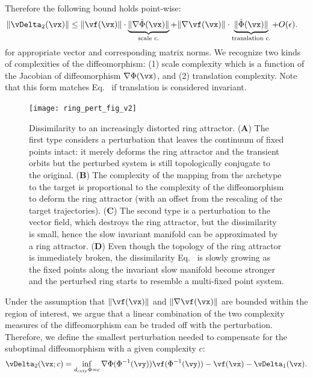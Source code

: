 \documentclass{article}
\theoremstyle{definition} \newtheorem{definition}{Definition}  \newtheorem{example}{Example}
\theoremstyle{remark} \newtheorem{remark}{Remark}
\renewcommand{\eqref}{Eq.~\originaleqref}
\newcounter{ct}
\DeclarePairedDelimiter{\norm}{\lVert}{\rVert}
\newcommand{\inv}{^{-1}}
\newcommand{\dcomplexity}{\ensuremath{d_\text{cxty}}}
\newcommand{\homeo}{\Phi} %
\newcommand{\invhomeo}{\homeo\inv}
\begin{document}
Therefore the following bound holds point-wise:
\begin{align}
    \norm{\vDelta_2(\vx)}
    &\leq
	\norm{\vf(\vx)}
	\cdot
	\underbrace{
	    \norm{\nabla\tilde\homeo(\vx)}
	}_{\substack{\text{scale c.}}}
	+
	\norm{\nabla\vf(\vx)}
	\cdot
	\underbrace{
	\norm{\tilde\homeo(\vx)}
	}_{\substack{\text{translation c.}}}
	+ O(\epsilon).
    \label{eq:h:bound}
\end{align}
for appropriate vector and corresponding matrix norms.
We recognize two kinds of complexities of the diffeomorphism: (1) scale complexity which is a function of the Jacobian of diffeomorphism $\nabla\homeo(\vx)$, and (2) translation complexity.
Note that this form matches \eqref{eq:dcomplexity} if translation is considered invariant.

\begin{figure}[t!bhp]
    \centering
    \texttt{[image: ring\_pert\_fig\_v2]}
    \caption{Dissimilarity to an increasingly distorted ring attractor. %
    (\textbf{A}) The first type considers a perturbation that leaves the continuum of fixed points intact: it merely deforms the ring attractor and the transient orbits but the perturbed system is still topologically conjugate to the original. 
    (\textbf{B}) The complexity of the mapping from the archetype to the target is proportional to the complexity of the diffeomorphism to deform the ring attractor (with an offset from the rescaling of the target trajectories).
    (\textbf{C}) The second type is a perturbation to the vector field, which destroys the ring attractor, but the dissimilarity is small, hence the slow invariant manifold can be approximated by a ring attractor.
    (\textbf{D}) Even though the topology of the ring attractor is immediately broken, the dissimilarity \eqref{eq:loss} is slowly growing as the fixed points along the invariant slow manifold become stronger and the perturbed ring starts to resemble a multi-fixed point system.
    }
    \label{fig:ring_pert_fig}
\end{figure}

Under the assumption that $\norm{\vf(\vx)}$ and $\norm{\nabla\vf(\vx)}$ are bounded within the region of interest, we argue that a linear combination of the two complexity measures of the diffeomorphism can be traded off with the perturbation.
Therefore, we define the smallest perturbation needed to compensate for the suboptimal diffeomorphism with a given complexity $c$:
\begin{align}
    \vDelta_2(\vx ; c) = \inf_{\dcomplexity{\homeo} = c}
	\nabla\homeo(\invhomeo(\vy)) \vf(\invhomeo(\vy))
	- \vf(\vx) - \vDelta_1(\vx).
\end{align}
\end{document}
